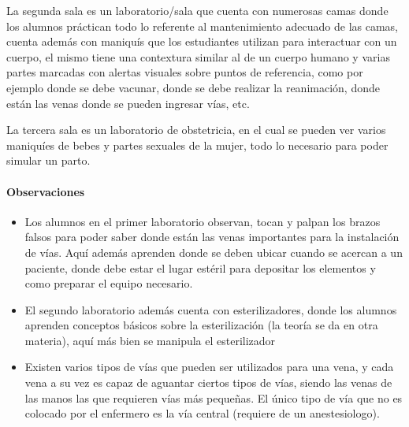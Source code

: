 La segunda sala es un laboratorio/sala que cuenta con numerosas camas
donde los alumnos práctican todo lo referente al mantenimiento adecuado
de las camas, cuenta además con maniquís que los estudiantes utilizan
para interactuar con un cuerpo, el mismo tiene una contextura similar al
de un cuerpo humano y varias partes marcadas con alertas visuales sobre
puntos de referencia, como por ejemplo donde se debe vacunar, donde se
debe realizar la reanimación, donde están las venas donde se pueden
ingresar vías, etc.

La tercera sala es un laboratorio de obstetricia, en el cual se pueden
ver varios maniquíes de bebes y partes sexuales de la mujer, todo lo
necesario para poder simular un parto.

\paragraph{Observaciones}\label{observaciones-1}

\begin{itemize}
\itemsep1pt\parskip0pt
\item
  Los alumnos en el primer laboratorio observan, tocan y palpan los
  brazos falsos para poder saber donde están las venas importantes para
  la instalación de vías. Aquí además aprenden donde se deben ubicar
  cuando se acercan a un paciente, donde debe estar el lugar estéril
  para depositar los elementos y como preparar el equipo necesario.
\item
  El segundo laboratorio además cuenta con esterilizadores, donde los
  alumnos aprenden conceptos básicos sobre la esterilización (la teoría
  se da en otra materia), aquí más bien se manipula el esterilizador
\item
  Existen varios tipos de vías que pueden ser utilizados para una vena,
  y cada vena a su vez es capaz de aguantar ciertos tipos de vías,
  siendo las venas de las manos las que requieren vías más pequeñas. El
  único tipo de vía que no es colocado por el enfermero es la vía
  central (requiere de un anestesiologo).
\end{itemize}
